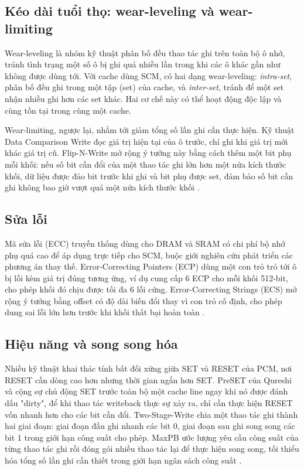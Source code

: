 \documentclass[12pt,a4paper]{article}
\begin{document}
\subsection{Kéo dài tuổi thọ: wear-leveling và wear-limiting}

Wear-leveling là nhóm kỹ thuật phân bố đều thao tác ghi trên toàn bộ ô nhớ, tránh tình trạng một số ô bị ghi quá nhiều lần trong khi các ô khác gần như không được dùng tới. Với cache dùng SCM, có hai dạng wear-leveling: \textit{intra-set}, phân bố đều ghi trong một tập (set) của cache, và \textit{inter-set}, tránh để một set nhận nhiều ghi hơn các set khác. Hai cơ chế này có thể hoạt động độc lập và cùng tồn tại trong cùng một cache.

Wear-limiting, ngược lại, nhắm tới giảm tổng số lần ghi cần thực hiện. Kỹ thuật Data Comparison Write đọc giá trị hiện tại của ô trước, chỉ ghi khi giá trị mới khác giá trị cũ. Flip-N-Write mở rộng ý tưởng này bằng cách thêm một bit phụ mỗi khối: nếu số bit cần đổi của một thao tác ghi lớn hơn một nửa kích thước khối, dữ liệu được đảo bit trước khi ghi và bit phụ được set, đảm bảo số bit cần ghi không bao giờ vượt quá một nửa kích thước khối \cite{kamath2019}.

\subsection{Sửa lỗi}

Mã sửa lỗi (ECC) truyền thống dùng cho DRAM và SRAM có chi phí bộ nhớ phụ quá cao để áp dụng trực tiếp cho SCM, buộc giới nghiên cứu phát triển các phương án thay thế. Error-Correcting Pointers (ECP) dùng một con trỏ trỏ tới ô bị lỗi kèm giá trị đúng tương ứng, ví dụ cung cấp 6 ECP cho mỗi khối 512-bit, cho phép khối đó chịu được tối đa 6 lỗi cứng. Error-Correcting Strings (ECS) mở rộng ý tưởng bằng offset có độ dài biến đổi thay vì con trỏ cố định, cho phép dung sai lỗi lớn hơn trước khi khối thất bại hoàn toàn \cite{kamath2019}.

\subsection{Hiệu năng và song song hóa}

Nhiều kỹ thuật khai thác tính bất đối xứng giữa SET và RESET của PCM, nơi RESET cần dòng cao hơn nhưng thời gian ngắn hơn SET. PreSET của Qureshi và cộng sự chủ động SET trước toàn bộ một cache line ngay khi nó được đánh dấu "dirty", để khi thao tác writeback thực sự xảy ra, chỉ cần thực hiện RESET vốn nhanh hơn cho các bit cần đổi. Two-Stage-Write chia một thao tác ghi thành hai giai đoạn: giai đoạn đầu ghi nhanh các bit 0, giai đoạn sau ghi song song các bit 1 trong giới hạn công suất cho phép. MaxPB ước lượng yêu cầu công suất của từng thao tác ghi rồi đóng gói nhiều thao tác lại để thực hiện song song, tối thiểu hóa tổng số lần ghi cần thiết trong giới hạn ngân sách công suất \cite{kamath2019}.
\end{document}
